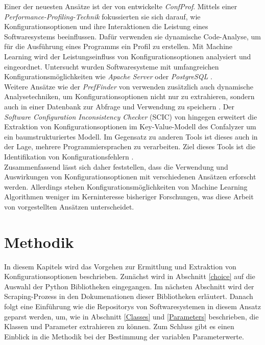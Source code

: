 \documentclass[german,bachelor]{swsLeipzig}
\begin{document}
\indent Einer der neuesten Ansätze ist der von \citeauthor{10.1145/3427921.3450255} entwickelte \textit{ConfProf}.
Mittels einer \textit{Performance-Profiling-Technik} fokussierten sie sich darauf, wie Konfigurationsoptionen und ihre Interaktionen
die Leistung eines Softwaresystems beeinflussen.
Dafür verwenden sie dynamische Code-Analyse, um für die Ausführung eines Programms ein Profil zu erstellen.
Mit Machine Learning wird der Leistungseinfluss von Konfigurationsoptionen analysiert und eingeordnet.
Untersucht wurden Softwaresysteme mit umfangreichen Konfigurationsmöglichkeiten wie \textit{Apache Server}
oder \textit{PostgreSQL}  \cite[]{10.1145/3427921.3450255}.\\
\indent Weitere Ansätze wie der \textit{PrefFinder} von \citeauthor{10.1145/2642937.2643009} verwenden zusätzlich auch dynamische
Analysetechniken, um Konfigurationsoptionen nicht nur zu extrahieren, sondern auch in einer Datenbank zur Abfrage und
Verwendung zu speichern \cite[]{10.1145/2642937.2643009}.
Der \textit{Software Configuration Inconsistency Checker} (SCIC) von \citeauthor{10.1145/2786805.2786869} hingegen
erweitert die Extraktion von Konfigurationsoptionen im Key-Value-Modell des Confalyzer um ein baumstrukturiertes Modell.
Im Gegensatz zu anderen Tools ist dieses auch in der Lage, mehrere Programmiersprachen zu verarbeiten.
Ziel dieses Tools ist die Identifikation von Konfigurationsfehlern \cite[]{10.1145/2786805.2786869}.\\
\indent Zusammenfassend lässt sich daher feststellen, dass die Verwendung und Auswirkungen von Konfigurationsoptionen mit
verschiedenen Ansätzen erforscht werden.
Allerdings stehen Konfigurationsmöglichkeiten von Machine Learning Algorithmen weniger im Kerninteresse bisheriger Forschungen,
was diese Arbeit von vorgestellten Ansätzen unterscheidet.

\chapter{Methodik}\label{Methodik}
In diesem Kapitels wird das Vorgehen zur Ermittlung und Extraktion von Konfigurationsoptionen
beschrieben.
Zunächst wird in Abschnitt \ref{choice} auf die Auswahl der Python Bibliotheken eingegangen.
Im nächsten Abschnitt wird der Scraping-Prozess in den Dokumenationen dieser Bibliotheken erläutert.
Danach folgt eine Einführung wie die Repositorys von Softwaresystemen in diesem Ansatz geparst werden, um, wie in Abschnitt
\ref{Classes} und \ref{Parameters} beschrieben, die Klassen und Parameter extrahieren zu können.
Zum Schluss gibt es einen Einblick in die Methodik bei der Bestimmung der variablen Parameterwerte. \\
\end{document}
